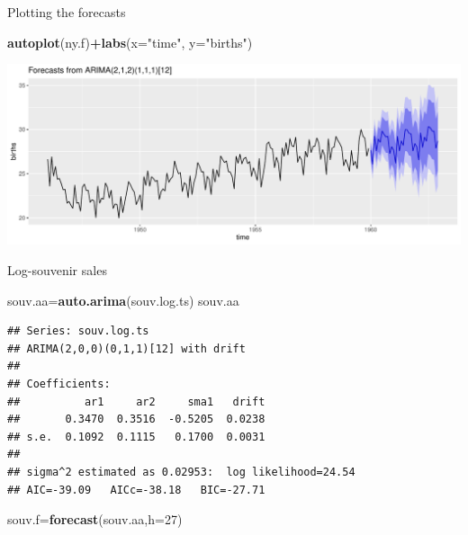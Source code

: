 \documentclass[
  ignorenonframetext,
]{beamer}
\newenvironment{Shaded}{\begin{snugshade}}{\end{snugshade}}
\newcommand{\DataTypeTok}[1]{\textcolor[rgb]{0.13,0.29,0.53}{#1}}
\newcommand{\DecValTok}[1]{\textcolor[rgb]{0.00,0.00,0.81}{#1}}
\newcommand{\KeywordTok}[1]{\textcolor[rgb]{0.13,0.29,0.53}{\textbf{#1}}}
\newcommand{\NormalTok}[1]{#1}
\newcommand{\OperatorTok}[1]{\textcolor[rgb]{0.81,0.36,0.00}{\textbf{#1}}}
\newcommand{\StringTok}[1]{\textcolor[rgb]{0.31,0.60,0.02}{#1}}
\begin{document}
\begin{frame}[fragile]{Plotting the forecasts}
\protect\hypertarget{plotting-the-forecasts}{}

\begin{Shaded}
\begin{Highlighting}[]
\KeywordTok{autoplot}\NormalTok{(ny.f)}\OperatorTok{+}\KeywordTok{labs}\NormalTok{(}\DataTypeTok{x=}\StringTok{"time"}\NormalTok{, }\DataTypeTok{y=}\StringTok{"births"}\NormalTok{)}
\end{Highlighting}
\end{Shaded}

\includegraphics{slides_d29_files/figure-beamer/unnamed-chunk-577-1.pdf}

\end{frame}

\begin{frame}[fragile]{Log-souvenir sales}
\protect\hypertarget{log-souvenir-sales}{}

\begin{Shaded}
\begin{Highlighting}[]
\NormalTok{souv.aa=}\KeywordTok{auto.arima}\NormalTok{(souv.log.ts)}
\NormalTok{souv.aa}
\end{Highlighting}
\end{Shaded}

\begin{verbatim}
## Series: souv.log.ts 
## ARIMA(2,0,0)(0,1,1)[12] with drift 
## 
## Coefficients:
##          ar1     ar2     sma1   drift
##       0.3470  0.3516  -0.5205  0.0238
## s.e.  0.1092  0.1115   0.1700  0.0031
## 
## sigma^2 estimated as 0.02953:  log likelihood=24.54
## AIC=-39.09   AICc=-38.18   BIC=-27.71
\end{verbatim}

\begin{Shaded}
\begin{Highlighting}[]
\NormalTok{souv.f=}\KeywordTok{forecast}\NormalTok{(souv.aa,}\DataTypeTok{h=}\DecValTok{27}\NormalTok{)}
\end{Highlighting}
\end{Shaded}

\end{frame}
\end{document}
